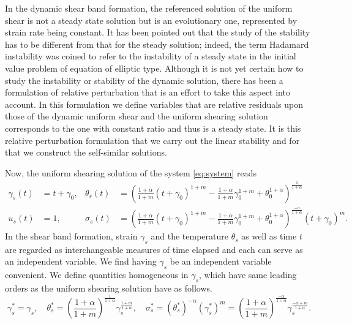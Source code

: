 \documentclass[a4paper,11pt]{article}
\theoremstyle{remark}
\begin{document}
In the dynamic shear band formation, the referenced solution of the uniform shear is not a steady state solution but is an evolutionary one, represented by strain rate being constant. It has been pointed out that the study of the stability has to be different from that for the steady solution; indeed, the term Hadamard instability  was coined to refer to the instability of a steady state in the initial value problem of equation of elliptic type. Although it is not yet certain how to study the instability or stability of the dynamic solution, there has been a formulation of relative perturbation \cite{MC,FM,Tzavaras92} that is an effort to take this aspect into account. In this formulation we define variables that are relative residuals upon those of the dynamic uniform shear and the uniform shearing solution corresponds to the one with constant ratio and thus is a steady state. It is this relative perturbation formulation that we carry out the linear stability and for that we construct the self-similar solutions.

Now, the uniform shearing solution of the system \eqref{eq:system} reads
\begin{equation}
\begin{aligned}
 \gamma_s(t) &= t+\gamma_0, & \theta_s(t) &= \left(\frac{1+\alpha}{1+m} (t+\gamma_0)^{1+m} - \frac{1+\alpha}{1+m} \gamma_0^{1+m} + \theta_0^{1+\alpha}   \right)^{\frac{1}{1+\alpha}}\\
  u_s(t) &=1, & \sigma_s(t)&=\left(\frac{1+\alpha}{1+m} (t+\gamma_0)^{1+m} - \frac{1+\alpha}{1+m} \gamma_0^{1+m} + \theta_0^{1+\alpha}   \right)^{\frac{-\alpha}{1+\alpha}}(t+\gamma_0)^m.
\end{aligned}
\end{equation}
In the shear band formation, strain $\gamma_s$ and the temperature $\theta_s$ as well as time $t$ are regarded as interchangeable measures of time elapsed and each can serve as an independent variable. We find having $\gamma_s$ be an independent variable convenient. We define quantities homogeneous in $\gamma _s$, which have same leading orders as the uniform shearing solution have as follows.
$$ \gamma_s^* = \gamma_s, \quad \theta_s^*=\left( \frac{1+\alpha}{1+m}\right)^{\frac{1}{1+\alpha}} \gamma_s^{\frac{1+m}{1+\alpha}}, \quad \sigma^*_s = (\theta_s^*)^{-\alpha}(\gamma_s^*)^m = \left( \frac{1+\alpha}{1+m}\right)^{\frac{-\alpha}{1+\alpha}}\gamma_s^{\frac{-\alpha+m}{1+\alpha}}.$$
\end{document}
